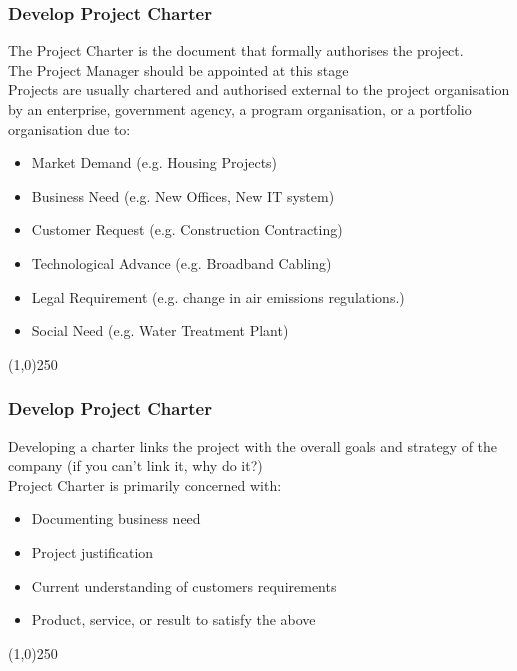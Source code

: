\begin{frame}
\frametitle{Develop Project Charter}
The Project Charter is the document that formally authorises the project.\\
The Project Manager should be appointed at this stage\\
Projects are usually chartered and authorised external to the project organisation by an enterprise, government agency, a program organisation, or a portfolio organisation due to:
\begin{itemize}
	\item Market Demand (e.g. Housing Projects)
	\item Business Need (e.g. New Offices, New IT system)
	\item Customer Request (e.g. Construction Contracting)
	\item Technological Advance (e.g. Broadband Cabling)
	\item Legal Requirement (e.g. change in air emissions regulations.)
	\item Social Need (e.g. Water Treatment Plant)
\end{itemize}
\end{frame}\begin{center}\line(1,0){250}\end{center}
%
%
\begin{frame}
\frametitle{Develop Project Charter}
Developing a charter links the project with the overall goals and strategy of the company (if you can't link it, why do it?)\\
Project Charter is primarily concerned with:
\begin{itemize}
	\item Documenting business need
	\item Project justification
	\item Current understanding of customers requirements
	\item Product, service, or result to satisfy the above
\end{itemize}
\end{frame}\begin{center}\line(1,0){250}\end{center}
%
%

